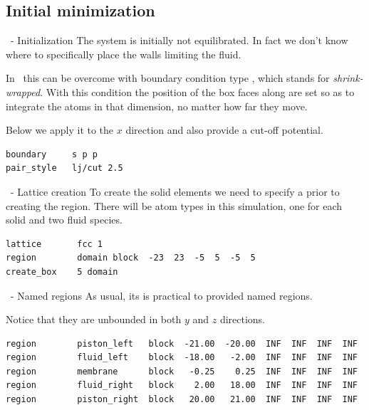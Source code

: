 \subsection{Initial minimization}

\begin{frame}[fragile]{\secname}{\subsecname\ - Initialization}
The system is initially not equilibrated. In fact we don't know where to specifically place the walls limiting the fluid.

\vspace{0.5cm}

In \LAMMPS\ this can be overcome with boundary condition type , which stands for \emph{shrink-wrapped}. With this condition the position of the box faces along are set so as to integrate the atoms in that dimension, no matter how far they move.

\vspace{0.5cm}

Below we apply it to the $x$ direction and also provide a  cut-off potential.

\vspace{0.5cm}

\begin{lstlisting}[language=LAMMPS,basicstyle=\small]
boundary	 s p p
pair_style	 lj/cut 2.5
\end{lstlisting}
\end{frame}

\begin{frame}[fragile]{\secname}{\subsecname\ - Lattice creation}
To create the solid elements we need to specify a  prior to creating the region. There will be  atom types in this simulation, one for each solid and two fluid species.

\vspace{0.5cm}

\begin{lstlisting}[language=LAMMPS,basicstyle=\small]
lattice       fcc 1
region        domain block  -23  23  -5  5  -5  5
create_box    5 domain
\end{lstlisting}
\end{frame}

\begin{frame}[fragile]{\secname}{\subsecname\ - Named regions}
As usual, its is practical to provided named regions.

\vspace{0.5cm}

Notice that they are unbounded in both $y$ and $z$ directions.

\vspace{0.5cm}

\begin{lstlisting}[language=LAMMPS,basicstyle=\tiny]
region        piston_left   block  -21.00  -20.00  INF  INF  INF  INF
region        fluid_left    block  -18.00   -2.00  INF  INF  INF  INF
region        membrane      block   -0.25    0.25  INF  INF  INF  INF
region        fluid_right   block    2.00   18.00  INF  INF  INF  INF
region        piston_right  block   20.00   21.00  INF  INF  INF  INF
\end{lstlisting}
\end{frame}

